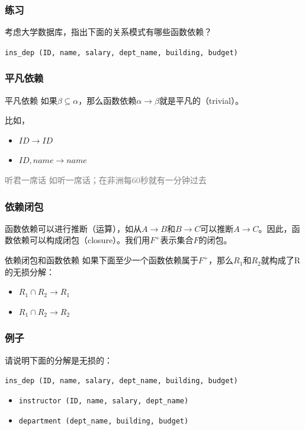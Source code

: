 \documentclass[aspectratio=169, 14pt]{beamer}
\begin{document}
\begin{frame}
	\frametitle{练习}
	考虑大学数据库，指出下面的关系模式有哪些函数依赖？

	\texttt{ins\_dep (ID, name, salary, dept\_name, building, budget)
	}

\end{frame}

\begin{frame}
	\frametitle{平凡依赖}
	\begin{exampleblock}{平凡依赖}
		如果$\beta \subseteq \alpha$，那么函数依赖$\alpha \rightarrow \beta$就是\alert{平凡的}（trivial）。
	\end{exampleblock}

	比如，
	\begin{itemize}
		\item $ID \rightarrow ID$
		\item $ID, name \rightarrow name$
	\end{itemize}

	\textcolor{gray}{听君一席话 如听一席话；在非洲每60秒就有一分钟过去}
\end{frame}

\begin{frame}
	\frametitle{依赖闭包}
	函数依赖可以进行推断（运算），如从$A \rightarrow B$和$B \rightarrow C$可以推断$A \rightarrow C$。因此，函数依赖可以构成\alert{闭包}（closure）。我们用$F^+$表示集合$F$的闭包。

	\pause
	\begin{exampleblock}{依赖闭包和函数依赖}
		如果下面至少一个函数依赖属于$F^+$，那么$R_1$和$R_2$就构成了R的无损分解：

		\begin{itemize}
			\item $R_1 \cap R_2 \rightarrow R_1$
			\item $R_1 \cap R_2 \rightarrow R_2$
		\end{itemize}
	\end{exampleblock}

\end{frame}

\begin{frame}
	\frametitle{例子}
	请说明下面的分解是无损的：

	\texttt{ins\_dep (ID, name, salary, dept\_name, building, budget)
	}

	\begin{itemize}
		\item \texttt{instructor (ID, name, salary, dept\_name)    }
		\item \texttt{department (dept\_name, building, budget)}
	\end{itemize}


\end{frame}
\end{document}
